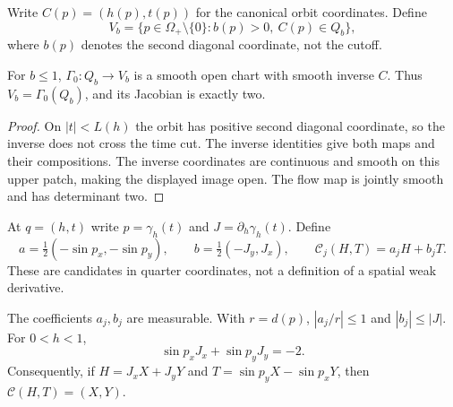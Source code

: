 \begin{definition}
\label{def:quarter-image}
\leanok
Write $C(p)=(h(p),t(p))$ for the canonical orbit coordinates.
Define
\[
 V_b=\{p\in\Omega_+\setminus\{0\}: b(p)>0,\ C(p)\in Q_b\},
\]
where $b(p)$ denotes the second diagonal coordinate, not the cutoff.
\end{definition}

\begin{lemma}
\label{lem:quarter-open-chart}
\leanok
For $b\le1$, $\Gamma_0:Q_b\to V_b$ is a smooth open chart with smooth
inverse $C$. Thus $V_b=\Gamma_0(Q_b)$, and its Jacobian is exactly two.
\end{lemma}

\begin{proof}
\leanok
On $|t|<L(h)$ the orbit has positive second diagonal coordinate, so
the inverse does not cross the time cut. The inverse identities give
both maps and their compositions. The inverse coordinates are continuous
and smooth on this upper patch, making the displayed image open.
The flow map is jointly smooth and has determinant two.
\end{proof}

\begin{definition}
\label{def:quarter-inverse-frame}
\leanok
At $q=(h,t)$ write $p=\gamma_h(t)$ and $J=\partial_h\gamma_h(t)$.
Define
\[
 a=\tfrac12(-\sin p_x,-\sin p_y),\qquad
 b=\tfrac12(-J_y,J_x),\qquad
 \mathcal C_j(H,T)=a_jH+b_jT.
\]
These are candidates in quarter coordinates, not a definition of
a spatial weak derivative.
\end{definition}

\begin{lemma}
\label{lem:quarter-inverse-frame-algebra}
\leanok
The coefficients $a_j,b_j$ are measurable. With $r=d(p)$,
$|a_j/r|\le1$ and $|b_j|\le|J|$.
For $0<h<1$,
\[
 \sin p_xJ_x+\sin p_yJ_y=-2.
\]
Consequently, if $H=J_xX+J_yY$ and
$T=\sin p_yX-\sin p_xY$, then $\mathcal C(H,T)=(X,Y)$.
\end{lemma}

